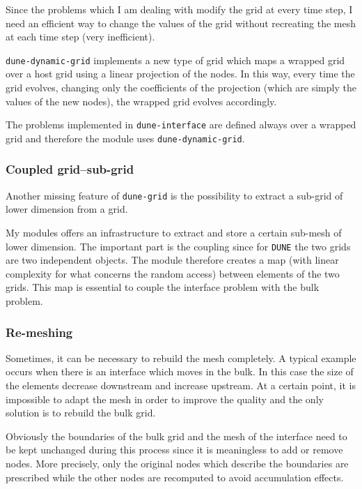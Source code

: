 \documentclass[a4paper,11pt, onecolumn]{article}
\begin{document}
\noindent Since the problems which I am dealing with modify the grid at every time step, I need an efficient way to change the values of the grid without recreating the mesh at each time step (very inefficient).

\noindent \verb|dune-dynamic-grid| implements a new type of grid which maps a wrapped grid over a host grid using a linear projection of the nodes. In this way, every time the grid evolves, changing only the coefficients of the projection (which are simply the values of the new nodes), the wrapped grid evolves accordingly.
\newline

\noindent The problems implemented in \verb|dune-interface| are defined always over a wrapped grid and therefore the module uses \verb|dune-dynamic-grid|.

\subsubsection{Coupled grid--sub-grid}

Another missing feature of \verb|dune-grid| is the possibility to extract a sub-grid of lower dimension from a grid.
\newline

\noindent My modules offers an infrastructure to extract and store a certain sub-mesh of lower dimension. The important part is the coupling since for \verb|DUNE| the two grids are two independent objects. The module therefore creates a map (with linear complexity for what concerns the random access) between elements of the two grids. This map is essential to couple the interface problem with the bulk problem.  

\subsubsection{Re-meshing}

Sometimes, it can be necessary to rebuild the mesh completely. A typical example occurs when there is an interface which moves in the bulk. In this case the size of the elements decrease downstream and increase upstream. At a certain point, it is impossible to adapt the mesh in order to improve the quality and the only solution is to rebuild the bulk grid.

\noindent Obviously the boundaries of the bulk grid and the mesh of the interface need to be kept unchanged during this process since it is meaningless to add or remove nodes. More precisely, only the original nodes which describe the boundaries are prescribed while the other nodes are recomputed to avoid accumulation effects. 
\newline
\end{document}
